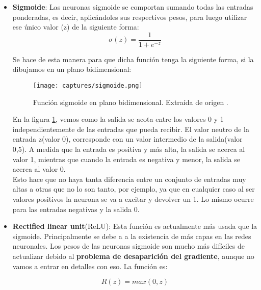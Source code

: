 \documentclass[11pt,fleqn]{book} %
\begin{document}
\begin{itemize}
	\item \textbf{Sigmoide}: Las neuronas sigmoide se comportan sumando todas las entradas ponderadas, es decir, aplicándoles sus respectivos pesos, para luego utilizar ese único valor (z) de la siguiente forma: 
	\begin{equation*}
	\sigma(z) = \frac{1}{1+e^{-z}}
	\end{equation*}
	
	Se hace de esta manera para que dicha función tenga la siguiente forma, si la dibujamos en un plano bidimensional:
	
	\begin{figure}[H]
		\centering\texttt{[image: captures/sigmoide.png]}
		\caption{Función sigmoide en plano bidimensional. Extraída de origen \cite{article:redNeuronal2}.}
		\label{fig:sigmoide} %
	\end{figure}

	En la figura \ref{fig:sigmoide}, vemos como la salida se acota entre los valores 0 y 1 independientemente de las entradas que pueda recibir. El valor neutro de la entrada z(valor 0), corresponde con un valor intermedio de la salida(valor 0,5). A medida que la entrada es positiva y más alta, la salida se acerca al valor 1, mientras que cuando la entrada es negativa y menor, la salida se acerca al valor 0. \\
	
	Esto hace que no haya tanta diferencia entre un conjunto de entradas muy altas a otras que no lo son tanto, por ejemplo, ya que en cualquier caso al ser valores positivos la neurona se va a excitar y devolver un 1. Lo mismo ocurre para las entradas negativas y la salida 0. \\
	
	\item \textbf{Rectified linear unit}(ReLU): Esta función es actualmente más usada que la sigmoide. Principalmente se debe a a la existencia de más capas en las redes neuronales. Los pesos de las neuronas sigmoide son mucho más difíciles de actualizar debido al \textbf{problema de desaparición del gradiente}, aunque no vamos a entrar en detalles con eso. La función es:
	
	\begin{equation*}
	R(z) = max(0,z)
	\end{equation*}
	

\end{itemize}
\end{document}
